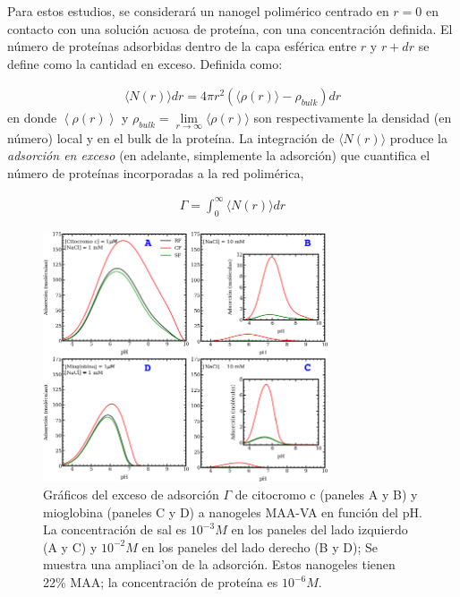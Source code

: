 Para estos estudios, se considerar\'a un nanogel polim\'erico centrado en $r=0$ en contacto con una soluci\'on acuosa de prote\'ina, con una concentraci\'on definida. El n\'umero de prote\'inas adsorbidas dentro de la capa esf\'erica entre $r$ y $r+dr$ se define como la cantidad en exceso. 
Definida como:


\begin{align}
     \langle N(r)\rangle dr = 4\pi r^2 \left(\langle\rho(r)\rangle - \rho_{bulk}\right) dr
\end{align}
%
en donde $\left<\rho(r)\right>$ y $\rho_{bulk}=\lim\limits_{r\to \infty } \langle\rho(r)\rangle$ son respectivamente la densidad (en n\'umero) local y en el bulk de la prote\'ina.
La integraci\'on de $\langle N(r)\rangle$ produce la \emph{adsorci\'on en exceso} (en adelante, simplemente la adsorci\'on) que cuantifica el n\'umero de prote\'inas incorporadas a la red polim\'erica,


%
\begin{align}
    \Gamma =  \int_0^\infty{  \langle N(r)\rangle dr}
\end{align}
%



\begin{figure}[!htb]
	\centering
\includegraphics[width=0.75\textwidth]{Figures/graphs-gel2/ad-maa-pH-proteins.pdf}
\caption{Gr\'aficos del exceso de adsorci\'on $\Gamma$ de citocromo c (paneles A y B) y mioglobina (paneles C y D) a nanogeles MAA-VA en funci\'on del pH.
	La concentraci\'on de sal es $10^{-3}M$ en los paneles del lado izquierdo (A y C) y $10^{-2}M$ en los paneles del lado derecho
	(B y D); Se muestra una ampliaci'on de la adsorci\'on.
	Estos nanogeles tienen 22\% MAA; la concentraci\'on de prote\'ina es $10^{-6}M$.}
\label{fig:esf:adsorption-vs-pH-cyto-myo}
\end{figure}
 
